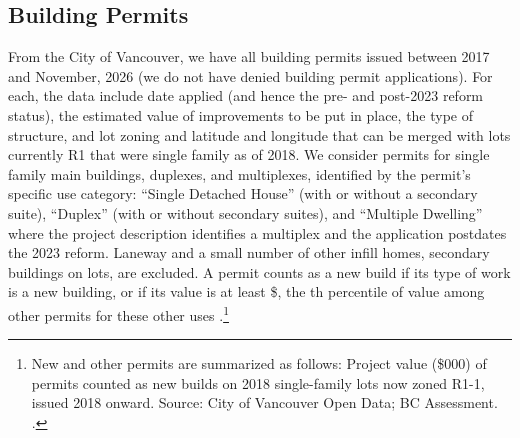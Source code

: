 \documentclass[12pt]{article}
\begin{document}
\begin{table}[htbp]
        \centering
        \caption{\label{tab:elasPpsf}Correlations across census tracts of the elasticity of price with respect to built square footage (built elasticity), the lot size elasticity of price, the duplex price per square foot premium, local log price per square foot, and a West Side indicator (west of Ontario Street). Built elasticity and log price per square foot: single family sales on 33' lots now zoned R1, \ppsfFirstYear{} to \duplexCouncilMonth{} \ppsfLastYear. Lot size elasticity: tract-specific slope of log price on log lot area, with sale-year and structure-age fixed effects, from \lotElasSales{} single family sales on lots of any width now zoned R1 where the structure is less than \lotElasMaxAgePlusOne{} years old at sale, same period \parencite{BCAssessment2019}. Correlations not involving the duplex premium use the \lotElasNTract{} tracts (\lotElasNWestTract{} West Side) with at least \lotElasMinSales{} sales in both samples; those involving the duplex premium use the \lotElasNDupTract{} of these tracts (\lotElasNDupWestTract{} West Side) with at least \dupMinSales{} strata duplex sales.}
        \resizebox{\textwidth}{!}{}
\end{table}


\subsection{Building Permits}

From the City of Vancouver, we have all building permits issued between 2017 and November, 2026 (we do not have denied building permit applications). For each, the data include date applied (and hence the pre- and post-2023 reform status), the estimated value of improvements to be put in place, the type of structure, and lot zoning and latitude and longitude that can be merged with lots currently R1 that were single family as of 2018. We consider permits for single family main buildings, duplexes, and multiplexes, identified by the permit's specific use category: ``Single Detached House'' (with or without a secondary suite), ``Duplex'' (with or without secondary suites), and ``Multiple Dwelling'' where the project description identifies a multiplex and the application postdates the 2023 reform. Laneway and a small number of other infill homes, secondary buildings on lots, are excluded. A permit counts as a new build if its type of work is a new building, or if its value is at least \$\newBuildValueThreshold{}, the \newBuildValueQuantile{}th percentile of value among other permits for these other uses \parencite{COVdata}.\footnote{New and other permits are summarized as follows:
Project value (\$000) of permits counted as new builds on 2018 single-family lots now zoned R1-1, issued 2018 onward. Source: City of Vancouver Open Data; BC Assessment.
.}
\end{document}
